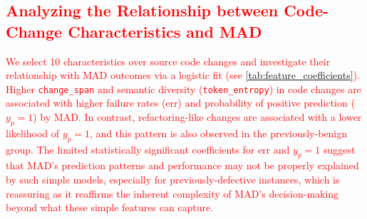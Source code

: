 \documentclass[authoryear,final,5p,times,twocolumn]{elsarticle}
\theoremstyle{plain}
\begin{document}
\subsection{\textcolor{red}{Analyzing the Relationship between Code-Change Characteristics and MAD}}
\label{sec:code_change_chars_MAD}
\textcolor{red}{
We select 10 characteristics over source code changes and investigate their relationship with MAD outcomes via a logistic fit (see \autoref{tab:feature_coefficients}). Higher \texttt{change\_span} and semantic diversity (\texttt{token\_entropy}) in code changes are associated with higher failure rates ($\text{err}$) and probability of positive prediction ($y_p=1$) by MAD. In contrast, refactoring-like changes are associated with a lower likelihood of $y_p=1$, and this pattern is also observed in the previously-benign group. The limited statistically significant coefficients for $\text{err}$ and $y_p=1$ suggest that MAD's prediction patterns and performance may not be properly explained by such simple models, especially for previously-defective instances, which is reassuring as it reaffirms the inherent complexity of MAD’s decision-making beyond what these simple features can capture.
}
\end{document}
